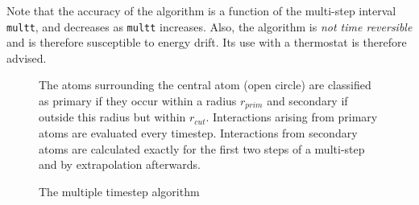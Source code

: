 Note that the accuracy of the algorithm is a function of the
multi-step interval {\tt multt}, and decreases as {\tt multt}
increases. Also, the algorithm is {\em not
time reversible} and is therefore susceptible to energy drift. Its use
with a thermostat is therefore advised.

\begin{figure}[ht]
\begin{center}
\centerline{}
\caption{The multiple timestep algorithm}
\end{center}
The atoms surrounding the central atom (open circle) are classified as
primary if they occur within a radius $r_{prim}$ and secondary if
outside this radius but within $r_{cut}$. Interactions arising from
primary atoms are evaluated every timestep. Interactions from secondary atoms are calculated exactly
for the first two steps of a multi-step and by extrapolation
afterwards.
\end{figure}



